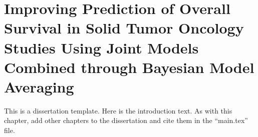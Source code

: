 \chapter{Improving Prediction of Overall Survival in Solid Tumor Oncology Studies Using Joint Models Combined through Bayesian Model Averaging}
\label{chpt:chpt3}

This is a dissertation template. Here is the introduction text. As with this chapter, add other chapters to the dissertation and cite them in the ``main.tex'' file.



\blindtext[3]